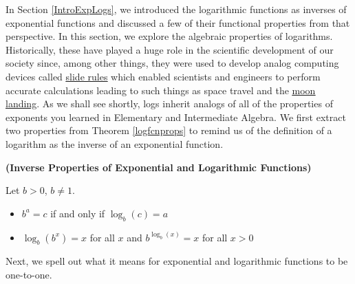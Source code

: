 

\setcounter{footnote}{0}

\label{LogProperties}

In Section \ref{IntroExpLogs}, we introduced the logarithmic functions as inverses of exponential functions and discussed a few of their functional properties from that perspective.  In this section, we explore the algebraic properties of logarithms.  Historically, these have played a huge role in the scientific development of our society since, among other things, they were used to develop analog computing devices called \href{http://en.wikipedia.org/wiki/Slide_rule}{\underline{slide rules}} which enabled scientists and engineers to perform accurate calculations leading to such things as space travel and the \href{http://www.redorbit.com/news/space/73297/nasa_marks_35th_anniversary_of_first_moon_landing/}{\underline{moon landing}}.  As we shall see shortly, logs inherit analogs of all of the properties of exponents you learned in Elementary and Intermediate Algebra.  We first extract two properties from Theorem \ref{logfcnprops} to remind us of the definition of a logarithm as the inverse of an exponential function.
\smallskip

\colorbox{ResultColor}{\bbm

\begin{thm}  \label{invpropslogs} \textbf{(Inverse Properties of Exponential and Logarithmic Functions)} 

Let $b > 0$, $b \neq 1$. 

\vspace{-.1in}

\begin{itemize}

\item   $b^{a} = c$ if and only if $\log_{b}(c) = a$

\item  $\log_{b} \left(b^{x}\right) = x$ for all $x$ and $b^{\log_{b}(x)} = x$ for all $x > 0$

\end{itemize}

\end{thm}

\ebm}

\smallskip

Next, we spell out what it means for exponential and logarithmic functions to be one-to-one.

